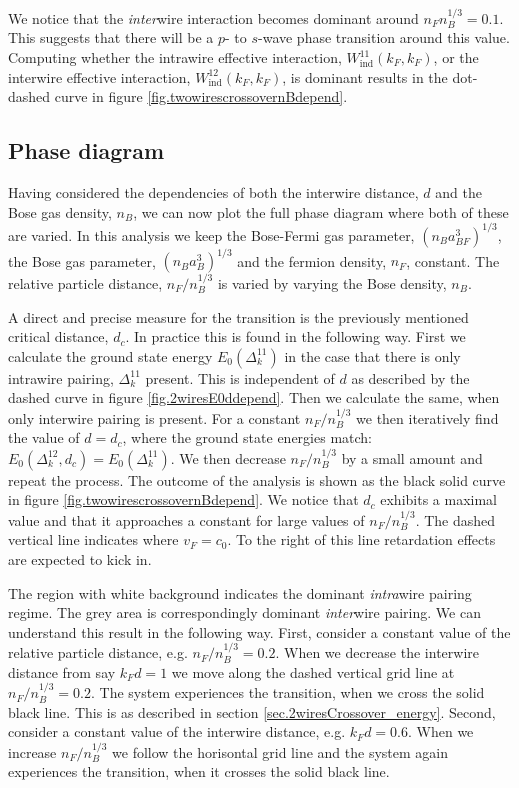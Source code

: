 We notice that the \textit{inter}wire interaction becomes dominant around $n_Fn_B^{1/3} = 0.1$. This suggests that there will be a $p$- to $s$-wave phase transition around this value. Computing whether the intrawire effective interaction, $W^{11}_{\text{ind}}(k_F,k_F)$, or the interwire effective interaction, $W^{12}_{\text{ind}}(k_F,k_F)$, is dominant results in the dot-dashed curve in figure \ref{fig.twowirescrossovernBdepend}. 

\subsection{Phase diagram} \label{subsec.phasediagram}
Having considered the dependencies of both the interwire distance, $d$ and the Bose gas density, $n_B$, we can now plot the full phase diagram where both of these are varied. In this analysis we keep the Bose-Fermi gas parameter, $(n_Ba_{BF}^3)^{1/3}$, the Bose gas parameter, $(n_Ba_B^3)^{1/3}$ and the fermion density, $n_F$, constant. The relative particle distance, $n_F / n_B^{1/3}$ is varied by varying the Bose density, $n_B$.  

A direct and precise measure for the transition is the previously mentioned critical distance, $d_c$. In practice this is found in the following way. First we calculate the ground state energy $E_0(\Delta^{11}_k)$ in the case that there is only intrawire pairing, $\Delta^{11}_k$ present. This is independent of $d$ as described by the dashed curve in figure \ref{fig.2wiresE0ddepend}. Then we calculate the same, when only interwire pairing is present. For a constant $n_F/n_B^{1/3}$ we then iteratively find the value of $d = d_c$, where the ground state energies match: $E_0(\Delta^{12}_k, d_c) = E_0(\Delta^{11}_k)$. We then decrease $n_F/n_B^{1/3}$ by a small amount and repeat the process. The outcome of the analysis is shown as the black solid curve in figure \ref{fig.twowirescrossovernBdepend}. We notice that $d_c$ exhibits a maximal value and that it approaches a constant for large values of $n_F/n_B^{1/3}$. The dashed vertical line indicates where $v_F = c_0$. To the right of this line retardation effects are expected to kick in. 

The region with white background indicates the dominant \textit{intra}wire pairing regime. The grey area is correspondingly dominant \textit{inter}wire pairing. We can understand this result in the following way. First, consider a constant value of the relative particle distance, e.g. $n_F/n_B^{1/3} = 0.2$. When we decrease the interwire distance from say $k_Fd = 1$ we move along the dashed vertical grid line at $n_F/n_B^{1/3} = 0.2$. The system experiences the transition, when we cross the solid black line. This is as described in section \ref{sec.2wiresCrossover_energy}. Second, consider a constant value of the interwire distance, e.g. $k_Fd = 0.6$. When we increase $n_F/n_B^{1/3}$ we follow the horisontal grid line and the system again experiences the transition, when it crosses the solid black line. 

